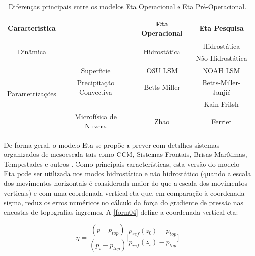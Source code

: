\begin{table}[!hbp]
\caption{Diferenças principais entre os modelos Eta Operacional e Eta Pré-Operacional.}
\label{tab02}
\centering
\begin{tabular}{c|c|c|c}
\hline
Característica                       &                         & Eta Operacional              & Eta Pesquisa          \\
\hline
\multirow{2}{2.8cm}{Dinâmica}        &                         & \multirow{2}{2.8cm}{Hidrostática}      & Hidrostática       \\
                                     &                         &                   & Não-Hidrostática   \\
\hline
                                     & Superfície              & OSU LSM\footnotemark[1]          & NOAH LSM\footnotemark[2]          \\ 
\multirow{2}{2.8cm}{Parametrizações} & Precipitação Convectiva & Betts-Miller      & Betts-Miller-Janjić\\
                                     &                         &                   & Kain-Fritsh        \\
                                     & Microfísica de Nuvens   & Zhao              & Ferrier            \\
\hline
\end{tabular}
\end{table}


De forma geral, o modelo Eta se propõe a prever com detalhes sistemas organizados de mesoescala tais como CCM, Sistemas Frontais, Brisas Marítimas, Tempestades e outros \cite{chou96}. Como principais características, esta versão do modelo Eta pode ser utilizada nos modos hidrostático e não hidrostático (quando a escala dos movimentos horizontais é considerada maior do que a escala dos movimentos verticais) e com uma coordenada vertical eta que, em comparação à coordenada sigma, reduz os erros numéricos no cálculo da força do gradiente de pressão nas encostas de topografias íngremes. A \autoref{form04} define a coordenada vertical eta:

\begin{equation}
\eta=\frac{(p-p_{top})}{(p_{s}-p_{top})}\bigg[\frac{p_{ref}(z_{0})-p_{top}}{p_{ref}(z_{s})-p_{top}}\bigg]
\label{form04}
\end{equation}


